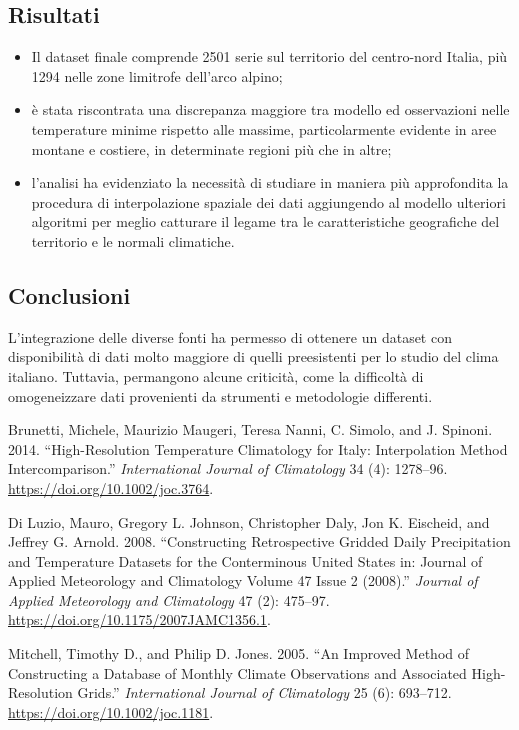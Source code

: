 \documentclass[
]{article}
\newlength{\cslhangindent}
\newenvironment{CSLReferences}[2] %
 {\begin{list}{}{%
  \setlength{\itemindent}{0pt}
  \setlength{\leftmargin}{0pt}
  \setlength{\parsep}{0pt}
  \ifodd #1
   \setlength{\leftmargin}{\cslhangindent}
   \setlength{\itemindent}{-1\cslhangindent}
  \fi
  \setlength{\itemsep}{#2\baselineskip}}}
 {\end{list}}
\providecommand{\tightlist}{%
  \setlength{\itemsep}{0pt}\setlength{\parskip}{0pt}}
\begin{document}
\subsection{Risultati}\label{risultati}

\begin{itemize}
\tightlist
\item
  Il dataset finale comprende 2501 serie sul territorio del centro-nord
  Italia, più 1294 nelle zone limitrofe dell'arco alpino;
\item
  è stata riscontrata una discrepanza maggiore tra modello ed
  osservazioni nelle temperature minime rispetto alle massime,
  particolarmente evidente in aree montane e costiere, in determinate
  regioni più che in altre;
\item
  l'analisi ha evidenziato la necessità di studiare in maniera più
  approfondita la procedura di interpolazione spaziale dei dati
  aggiungendo al modello ulteriori algoritmi per meglio catturare il
  legame tra le caratteristiche geografiche del territorio e le normali
  climatiche.
\end{itemize}

\subsection{Conclusioni}\label{conclusioni}

L'integrazione delle diverse fonti ha permesso di ottenere un dataset
con disponibilità di dati molto maggiore di quelli preesistenti per lo
studio del clima italiano. Tuttavia, permangono alcune criticità, come
la difficoltà di omogeneizzare dati provenienti da strumenti e
metodologie differenti.

\protect{}\label{refs}
\begin{CSLReferences}{1}{0}
Brunetti, Michele, Maurizio Maugeri, Teresa Nanni, C. Simolo, and J.
Spinoni. 2014. {``High-Resolution Temperature Climatology for {Italy}:
Interpolation Method Intercomparison.''} \emph{International Journal of
Climatology} 34 (4): 1278--96. \url{https://doi.org/10.1002/joc.3764}.

Di Luzio, Mauro, Gregory L. Johnson, Christopher Daly, Jon K. Eischeid,
and Jeffrey G. Arnold. 2008. {``Constructing {Retrospective Gridded
Daily Precipitation} and {Temperature Datasets} for the {Conterminous
United States} in: {Journal} of {Applied Meteorology} and {Climatology
Volume} 47 {Issue} 2 (2008).''} \emph{Journal of Applied Meteorology and
Climatology} 47 (2): 475--97.
\url{https://doi.org/10.1175/2007JAMC1356.1}.

Mitchell, Timothy D., and Philip D. Jones. 2005. {``An Improved Method
of Constructing a Database of Monthly Climate Observations and
Associated High-Resolution Grids.''} \emph{International Journal of
Climatology} 25 (6): 693--712. \url{https://doi.org/10.1002/joc.1181}.

\end{CSLReferences}
\end{document}
